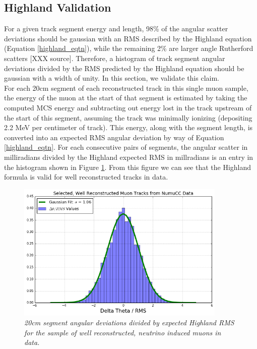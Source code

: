 \subsection{Highland Validation}\label{Highland_Validation_DataRecoTrack_section}
For a given track segment energy and length, 98\% of the angular scatter deviations should be gaussian with an RMS described by the Highland equation (Equation \ref{highland_eqtn}), while the remaining 2\% are larger angle Rutherford scatters [XXX source]. Therefore, a histogram of track segment angular deviations divided by the RMS predicted by the Highland equation should be gaussian with a width of unity. In this section, we validate this claim.\\

For each 20cm segment of each reconstructed track in this single muon sample, the energy of the muon at the start of that segment is estimated by taking the computed MCS energy and subtracting out energy lost in the track upstream of the start of this segment, assuming the track was minimally ionizing (depositing 2.2 MeV per centimeter of track). This energy, along with the segment length, is converted into an expected RMS angular deviation by way of Equation \ref{highland_eqtn}. For each consecutive pairs of segments, the angular scatter in milliradians divided by the Highland expected RMS in millradians is an entry in the histogram shown in Figure \ref{Highland_validation_DataRecoTracks_fig}. From this figure we can see that the Highland formula is valid for well reconstructed tracks in data.

\begin{figure}[h!]
\begin{center}
\includegraphics[width=100mm]{Figures/Highland_validation_DataRecoTracks_goodhandscan.png}
\end{center}
\caption{\textit{20cm segment angular deviations divided by expected Highland RMS for the sample of well reconstructed, neutrino induced muons in {\ub} data.}}
\label{Highland_validation_DataRecoTracks_fig}
\end{figure}


